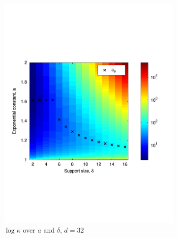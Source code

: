 \begin{figure}
  \centering
  \begin{subfigure}[b]{.49\textwidth}
    \centering
    \includegraphics[width=\textwidth,trim={.4in 2.5in .8in 2.5in}]{figs/exptable32}
    \caption{$\log \kappa$ over $a$ and $\delta$, $d = 32$}
    \label{fig:exptable}
  \end{subfigure}
  \begin{subfigure}[b]{.49\textwidth}
    \centering

\end{subfigure}
\end{figure}
